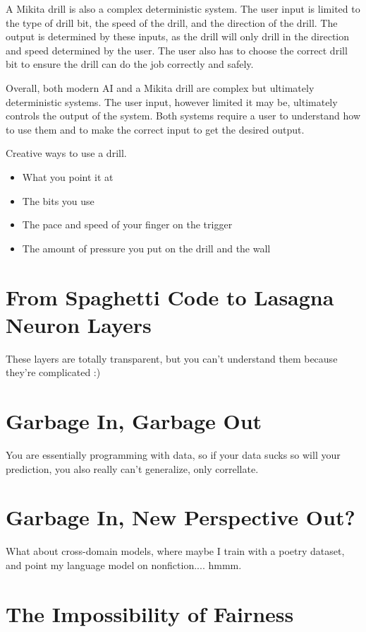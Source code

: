 A Mikita drill is also a complex deterministic system. The user input is limited to the type of drill bit, the speed of the drill, and the direction of the drill. The output is determined by these inputs, as the drill will only drill in the direction and speed determined by the user. The user also has to choose the correct drill bit to ensure the drill can do the job correctly and safely.

Overall, both modern AI and a Mikita drill are complex but ultimately deterministic systems. The user input, however limited it may be, ultimately controls the output of the system. Both systems require a user to understand how to use them and to make the correct input to get the desired output.

Creative ways to use a drill.
\begin{itemize}
\item What you point it at
\item The bits you use
\item The pace and speed of your finger on the trigger
\item The amount of pressure you put on the drill and the wall
\end{itemize}


\section{From Spaghetti Code to Lasagna Neuron Layers}

These layers are totally transparent, but you can't understand them because they're complicated :)

\section{Garbage In, Garbage Out}

You are essentially programming with data, so if your data sucks so will your prediction, you also really can't generalize, only correllate.

\section{Garbage In, New Perspective Out?}

What about cross-domain models, where maybe I train with a poetry dataset, and point my language model on nonfiction.... hmmm.

\section{The Impossibility of Fairness}


